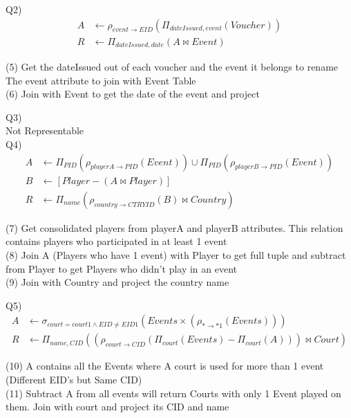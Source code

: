 \documentclass[12pt] {article}
\begin{document}
        Q2)
        \begin{align}
        	A &\leftarrow \rho_{event \rightarrow EID}(\Pi_{dateIssued, event}(Voucher))\\
       		R &\leftarrow \Pi_{dateIssued, date}(A \bowtie Event)
        \end{align}
        \begin{flushleft}
        (5) Get the dateIssued out of each voucher and the event it belongs to rename The event attribute to join with Event Table\\
        (6) Join with Event to get the date of the event and project\\
        \end{flushleft}

        Q3) \\
        
        	Not Representable\\
        
        Q4)
        \begin{align}
        	A &\leftarrow \Pi_{PID}(\rho_{playerA \rightarrow PID}(Event)) \cup \Pi_{PID}(\rho_{playerB\rightarrow PID}(Event))\\
        	B &\leftarrow [Player - (A \bowtie Player)]\\
        	R &\leftarrow \Pi_{name}(\rho_{country \rightarrow CTRYID}(B) \bowtie Country)
        \end{align}
        \begin{flushleft}
        (7) Get consolidated players from playerA and playerB attributes. This relation contains players who participated in at least 1 event\\
        (8) Join A (Players who have 1 event) with Player to get full tuple and subtract from Player to get Players who didn't play in an event\\
        (9) Join with Country and project the country name
        \end{flushleft}
        
        Q5) 
        \begin{align}
        	A &\leftarrow \sigma_{court = court1 \wedge EID \neq EID1}( Events \times (\rho_{* \rightarrow *1}(Events))) \\
            R &\leftarrow \Pi_{name, CID}((\rho_{court \rightarrow CID }(\Pi_{court}(Events)- \Pi_{court}(A))) \bowtie Court)
        \end{align}
        \begin{flushleft}
        (10) A contains all the Events where A court is used for more than 1 event (Different EID's but Same CID)\\
        (11) Subtract A from all events will return Courts with only 1 Event played on them. Join with court and project its CID and name
        \end{flushleft}
        
\end{document}

